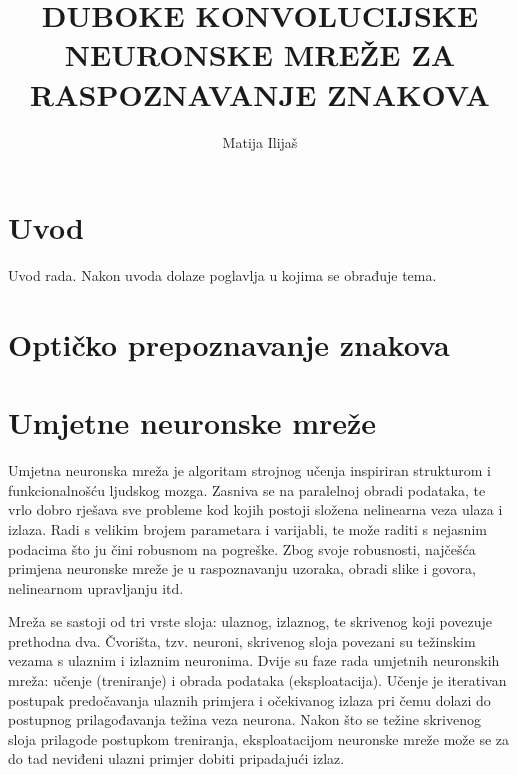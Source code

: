 \documentclass[lmodern, utf8, diplomski, numeric]{fer}
\begin{document}

\title{DUBOKE KONVOLUCIJSKE NEURONSKE MREŽE ZA RASPOZNAVANJE ZNAKOVA}

\author{Matija Ilijaš}

\maketitle


\zahvala{}

\tableofcontents

\chapter{Uvod}
Uvod rada. Nakon uvoda dolaze poglavlja u kojima se obrađuje tema.

\chapter{Optičko prepoznavanje znakova}

\chapter{Umjetne neuronske mreže}

Umjetna neuronska mreža je algoritam strojnog učenja inspiriran strukturom i funkcionalnošću ljudskog mozga. Zasniva se na paralelnoj obradi podataka, te vrlo dobro rješava sve probleme kod kojih postoji složena nelinearna veza ulaza i izlaza. Radi s velikim brojem parametara i varijabli, te može raditi s nejasnim podacima što ju čini robusnom na pogreške. Zbog svoje robusnosti, najčešća primjena neuronske mreže je u raspoznavanju uzoraka, obradi slike i govora, nelinearnom upravljanju itd.

Mreža se sastoji od tri vrste sloja: ulaznog, izlaznog, te skrivenog koji povezuje prethodna dva. Čvorišta, tzv. neuroni, skrivenog sloja povezani su težinskim vezama s ulaznim i izlaznim neuronima. Dvije su faze rada umjetnih neuronskih mreža: učenje (treniranje) i obrada podataka (eksploatacija). Učenje je iterativan postupak predočavanja ulaznih primjera i očekivanog izlaza pri čemu dolazi do postupnog prilagođavanja težina veza neurona. Nakon što se težine skrivenog sloja prilagode postupkom treniranja, eksploatacijom neuronske mreže može se za do tad neviđeni ulazni primjer dobiti pripadajući izlaz.
\end{document}
